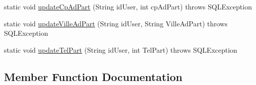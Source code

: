 \begin{DoxyCompactItemize}
\item 
static void \hyperlink{classcom_1_1ecetech_1_1bti4_1_1itproject_1_1classified_1_1dao_1_1_particulier_d_a_o_ada1b25c056da3b0e4b1fe9b9f32bbe47}{update\+Cp\+Ad\+Part} (String id\+User, int cp\+Ad\+Part)  throws S\+Q\+L\+Exception 
\item 
static void \hyperlink{classcom_1_1ecetech_1_1bti4_1_1itproject_1_1classified_1_1dao_1_1_particulier_d_a_o_aa902ab4baffe2f3d01ab2d652d084e57}{update\+Ville\+Ad\+Part} (String id\+User, String Ville\+Ad\+Part)  throws S\+Q\+L\+Exception 
\item 
static void \hyperlink{classcom_1_1ecetech_1_1bti4_1_1itproject_1_1classified_1_1dao_1_1_particulier_d_a_o_a1bf005b9911ce09d8daa26abf9fdf04e}{update\+Tel\+Part} (String id\+User, int Tel\+Part)  throws S\+Q\+L\+Exception 
\end{DoxyCompactItemize}


\subsection{Member Function Documentation}
